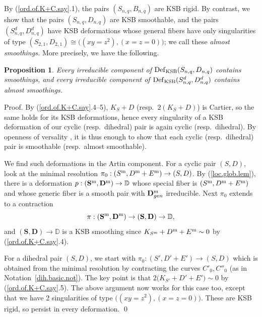 \documentclass{amsart}
\newtheorem{prop}[thm]{Proposition}
\theoremstyle{definition}
\theoremstyle{remark}
\newcommand{\dd}[0]{{\mathbb D}}
\newcommand{\defsp}[0]{\operatorname{Def}}
\begin{document}
By (\ref{ord.of.K+C.say}.1), the pairs  $(S_{n,q}, B_{n,q})$ are KSB rigid. By contrast, we show that the pairs  $(S_{n,q}, D_{n,q})$ are KSB smoothable, and the pairs 
$(S^d_{n,q}, D^d_{n,q})$ have KSB deformations whose general fibers have only
singularities of type 
$(S_{2,1}, D_{2,1})\cong  \bigl((xy=z^2), (x=z=0)\bigr)$; we call these
{\it almost smoothings.} More precisely, we have the following.

\begin{prop} \label{smoothing.prop}
  Every irreducible component of
  $\defsp_{\rm KSB} (S_{n,q}, D_{n,q})$ contains smoothings, and 
every irreducible component of
   $\defsp_{\rm KSB} (S^d_{n,q}, D^d_{n,q})$ contains almost smoothings.
\end{prop}



Proof.   By (\ref{ord.of.K+C.say}.4--5),  $K_S+D$ (resp.\ $2(K_S+D)$)  is Cartier, so the same holds for its KSB deformations, hence every singularity of a KSB deformation of our cyclic (resp.\ dihedral) pair is again   cyclic (resp.\ dihedral). By openness of versality
\cite{art-bri}, it is thus enough to show that each  cyclic (resp.\ dihedral) pair is smoothable  (resp.\ almost smoothable).

We find such deformations in the Artin component.
For a cyclic pair $(S, D)$, 
 look at the minimal resolution  
  $\pi_0:(S^{\rm m}, D^{\rm m}+E^{\rm m})\to (S, D)$. By (\ref{loc.glob.lem}),
 there is a deformation  $p: ({\mathbf S}^{\rm m}, {\mathbf D}^{\rm m})\to \dd$
 whose special fiber is $(S^{\rm m}, D^{\rm m}+E^{\rm m})$ and whose generic fiber is a smooth pair with ${\mathbf D}^{\rm m}_{gen}$ irreducible.
 Next $\pi_0$ extends to a contraction
 $$
 \pi:({\mathbf S}^{\rm m}, {\mathbf D}^{\rm m})\to
 ({\mathbf S}, {\mathbf D})\to \dd,
 $$
and $({\mathbf S}, {\mathbf D})\to \dd$ is a KSB smoothing
 since $K_{S^{\rm m}}+ D^{\rm m}+E^{\rm m}\sim 0$  by (\ref{ord.of.K+C.say}.4).


 For a dihedral pair $(S, D)$,  we start with
 $\pi_0:(S', D'+E')\to (S, D)$ which is obtained from the
 minimal resolution by contracting the curves  $C'_0, C''_0$  (as in Notation~\ref{dih.basic.not}).
  The key point is that $2\bigl(K_{S'}+ D'+E'\bigr)\sim 0$
  by (\ref{ord.of.K+C.say}.5).
  The above argument now works for this case too, except that we have 2 singularities of type
 $\bigl((xy=z^2), (x=z=0)\bigr)$. These are KSB rigid, so persist in every deformation. 
\qed
\end{document}
